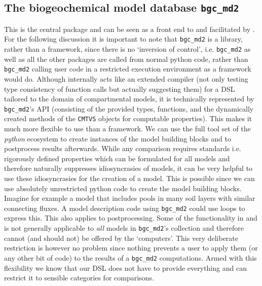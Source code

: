 \subsection{The biogeochemical model database \texttt{bgc\_md2}} This is the
central package and can be seen as a front end to \CompartmentalSystems and
\LAPM facilitated by \ComputabilityGraphs.  For the following discussion it is
important to note that \texttt{bgc\_md2} is a library, rather than a framework,
since there is no `inversion of control', i.e. \texttt{bgc\_md2} as well as all
the other packages are called from normal python code, rather than
\texttt{bgc\_md2} calling user code in a restricted execution environment as a
framework would do.  Although internally \ComputabilityGraphs acts like an
extended  compiler  (not only testing type consistency of function calls but
actually suggesting them) for a DSL tailored to the domain of compartmental
models, it is technically represented by \texttt{bgc\_md2}'s API (consisting of
the provided types, functions, and the dynamically created methods of the
\texttt{CMTVS} objects for computable properties).  This makes it much more
flexible to use than a framework. We can use the full tool set of the
\emph{python} ecosystem to create instances of the model building blocks and to
postprocess results afterwards.  While any comparison requires standards i.e.
rigorously defined properties which can be formulated for all models and
therefore naturally suppresses idiosyncrasies of models, it can be very helpful
to use these idiosyncrasies for the creation of a model.  This is possible
since we can use absolutely unrestricted python code to create the model
building blocks.  Imagine for example a model that includes pools in many soil
layers with similar connecting fluxes. A model description code using
\texttt{bgc\_md2} could use loops to express this.  This also applies to
postprocessing. Some of the functionality in \LAPM and \CompartmentalSystems is
not generally applicable to \emph{all} models in \texttt{bgc\_md2}'s collection
and therefore cannot (and should not) 
be offered by the `computers'. 
This very deliberate restriction is however no problem since 
nothing prevents a user to apply them (or any other bit of code) to the results of a
\texttt{bgc\_md2} computations.  
Armed with this flexibility we know that our
DSL does not have to provide everything and can restrict it to sensible categories
for comparisons.
